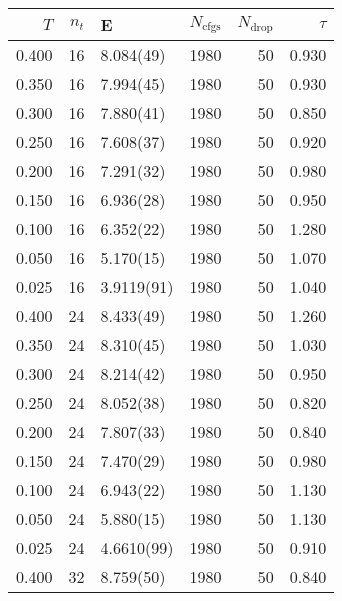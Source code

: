 \begin{tabular}{rrlrrr}
\hline
   $T$ &   $n_t$ & E          &   $N_\textrm{cfgs}$ &   $N_\textrm{drop}$ &   $\tau$ \\
\hline
 0.400 &      16 & 8.084(49)  &                1980 &                  50 &    0.930 \\
 0.350 &      16 & 7.994(45)  &                1980 &                  50 &    0.930 \\
 0.300 &      16 & 7.880(41)  &                1980 &                  50 &    0.850 \\
 0.250 &      16 & 7.608(37)  &                1980 &                  50 &    0.920 \\
 0.200 &      16 & 7.291(32)  &                1980 &                  50 &    0.980 \\
 0.150 &      16 & 6.936(28)  &                1980 &                  50 &    0.950 \\
 0.100 &      16 & 6.352(22)  &                1980 &                  50 &    1.280 \\
 0.050 &      16 & 5.170(15)  &                1980 &                  50 &    1.070 \\
 0.025 &      16 & 3.9119(91) &                1980 &                  50 &    1.040 \\
 0.400 &      24 & 8.433(49)  &                1980 &                  50 &    1.260 \\
 0.350 &      24 & 8.310(45)  &                1980 &                  50 &    1.030 \\
 0.300 &      24 & 8.214(42)  &                1980 &                  50 &    0.950 \\
 0.250 &      24 & 8.052(38)  &                1980 &                  50 &    0.820 \\
 0.200 &      24 & 7.807(33)  &                1980 &                  50 &    0.840 \\
 0.150 &      24 & 7.470(29)  &                1980 &                  50 &    0.980 \\
 0.100 &      24 & 6.943(22)  &                1980 &                  50 &    1.130 \\
 0.050 &      24 & 5.880(15)  &                1980 &                  50 &    1.130 \\
 0.025 &      24 & 4.6610(99) &                1980 &                  50 &    0.910 \\
 0.400 &      32 & 8.759(50)  &                1980 &                  50 &    0.840 \\

\end{tabular}
